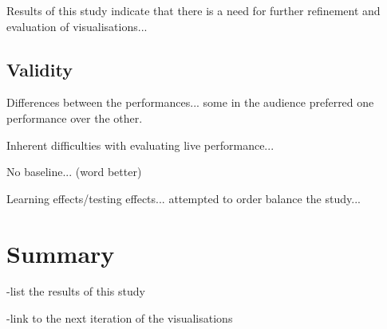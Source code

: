 Results of this study indicate that there is a need for further refinement and evaluation of visualisations... 

\subsection{Validity}

Differences between the performances... some in the audience preferred one performance over the other.

Inherent difficulties with evaluating live performance...

No baseline... (word better)

Learning effects/testing effects... attempted to order balance the study...

\section{Summary}

-list the results of this study



-link to the next iteration of the visualisations




